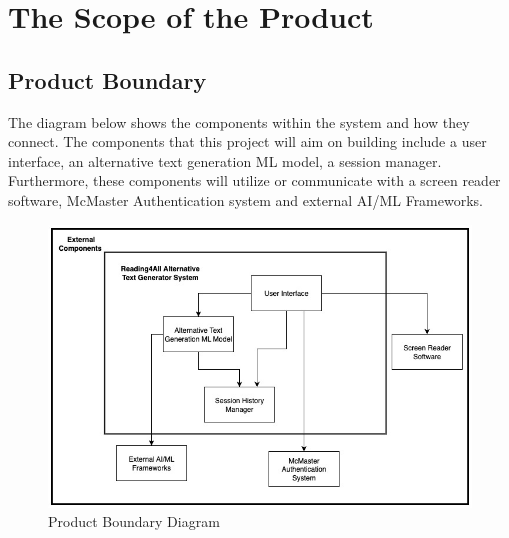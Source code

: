 \documentclass[12pt]{article}
\begin{document}
\section{The Scope of the Product}
\subsection{Product Boundary}
The diagram below shows the components within the system and how they connect. The components that this project will aim on building include a user interface, an alternative text generation ML model, a session manager. Furthermore, these components will utilize or communicate with a screen reader software, McMaster Authentication system and external AI/ML Frameworks. 
 \begin{figure}[H]
    \centering
    \includegraphics[width=1.0\textwidth]{images/Product_Boundary_Diagram.jpg}
    \caption{Product Boundary Diagram}
    \label{img:usecase}
\end{figure}
\end{document}
